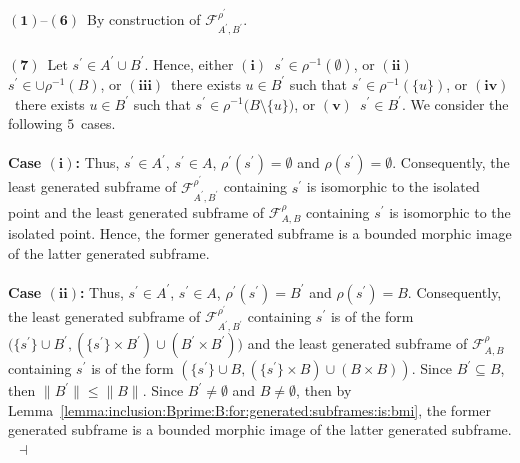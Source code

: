 \documentclass[draft]{article}
\newenvironment{proof}{{\bf Proof:}}{~$\dashv$\\}
\begin{document}
%
%
\begin{proof}
%
%
$\mathbf{(1)}$--$\mathbf{(6)}$~By construction of ${\mathcal F}_{A^{\prime},B^{\prime}}^{\rho^{\prime}}$.
%
%
\\
\\
%
%
$\mathbf{(7)}$~Let $s^{\prime}{\in}A^{\prime}{\cup}B^{\prime}$.
Hence, either $\mathbf{(i)}$~$s^{\prime}{\in}\rho^{-1}(\emptyset)$, or $\mathbf{(ii)}$~$s^{\prime}{\in}{\cup}\rho^{{-}1}(B)$, or $\mathbf{(iii)}$~there exists $u{\in}B^{\prime}$ such that $s^{\prime}{\in}\rho^{{-}1}(\{u\})$, or $\mathbf{(iv)}$~there exists $u{\in}B^{\prime}$ such that $s^{\prime}{\in}\rho^{{-}1}(B
%
%
%
%
%
%
%
%
%
%
%
%
$\linebreak$
%
%
%
%
%
%
%
%
%
%
%
%
{\setminus}\{u\})$, or $\mathbf{(v)}$~$s^{\prime}{\in}B^{\prime}$.
We consider the following $5$~cases.
%
%
\\
\\
%
%
{\bf Case $\mathbf{(i)}$:}
Thus, $s^{\prime}{\in}A^{\prime}$, $s^{\prime}{\in}A$, $\rho^{\prime}(s^{\prime}){=}\emptyset$ and $\rho(s^{\prime}){=}\emptyset$.
Consequently, the least generated subframe of ${\mathcal F}_{A^{\prime},B^{\prime}}^{\rho^{\prime}}$ containing $s^{\prime}$ is isomorphic to the isolated point and the least generated subframe of ${\mathcal F}_{A,B}^{\rho}$ containing $s^{\prime}$ is isomorphic to the isolated point.
Hence, the former generated subframe is a bounded morphic image of the latter generated subframe.
%
%
\\
\\
%
%
{\bf Case $\mathbf{(ii)}$:}
Thus, $s^{\prime}{\in}A^{\prime}$, $s^{\prime}{\in}A$, $\rho^{\prime}(s^{\prime}){=}B^{\prime}$ and $\rho(s^{\prime}){=}B$.
Consequently, the least generated subframe of ${\mathcal F}_{A^{\prime},B^{\prime}}^{\rho^{\prime}}$ containing $s^{\prime}$ is of the form $(\{s^{\prime}\}{\cup}B^{\prime},(\{s^{\prime}\}{\times}B^{\prime}){\cup}
%
%
%
%
%
%
%
%
%
%
%
%
$\linebreak$
%
%
%
%
%
%
%
%
%
%
%
%
(B^{\prime}{\times}B^{\prime}))$ and the least generated subframe of ${\mathcal F}_{A,B}^{\rho}$ containing $s^{\prime}$ is of the form $(\{s^{\prime}\}{\cup}B,(\{s^{\prime}\}{\times}B){\cup}(B{\times}B))$.
Since $B^{\prime}{\subseteq}B$, then ${\parallel}B^{\prime}{\parallel}{\leq}{\parallel}B{\parallel}$.
Since $B^{\prime}{\not=}\emptyset$ and $B{\not=}\emptyset$, then by Lemma~\ref{lemma:inclusion:Bprime:B:for:generated:subframes:is:bmi}, the former generated subframe is a bounded morphic image of the latter generated subframe.
%
%
\\

\end{proof}
\end{document}
